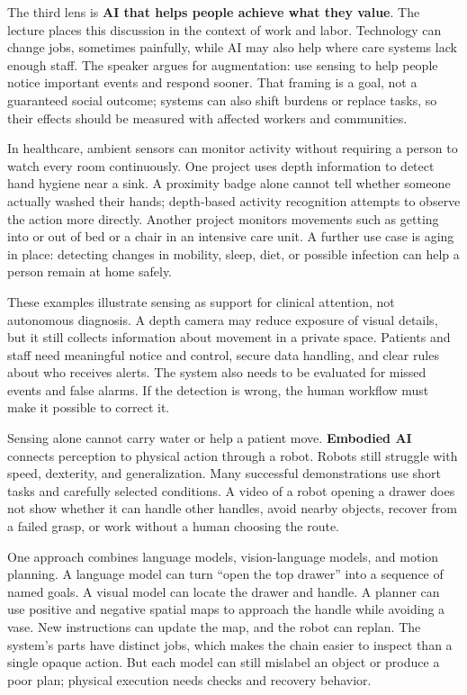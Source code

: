 The third lens is \textbf{AI that helps people achieve what they value}. The lecture places this discussion in the context of work and labor. Technology can change jobs, sometimes painfully, while AI may also help where care systems lack enough staff. The speaker argues for augmentation: use sensing to help people notice important events and respond sooner. That framing is a goal, not a guaranteed social outcome; systems can also shift burdens or replace tasks, so their effects should be measured with affected workers and communities.

In healthcare, ambient sensors can monitor activity without requiring a person to watch every room continuously. One project uses depth information to detect hand hygiene near a sink. A proximity badge alone cannot tell whether someone actually washed their hands; depth-based activity recognition attempts to observe the action more directly. Another project monitors movements such as getting into or out of bed or a chair in an intensive care unit. A further use case is aging in place: detecting changes in mobility, sleep, diet, or possible infection can help a person remain at home safely.

These examples illustrate sensing as support for clinical attention, not autonomous diagnosis. A depth camera may reduce exposure of visual details, but it still collects information about movement in a private space. Patients and staff need meaningful notice and control, secure data handling, and clear rules about who receives alerts. The system also needs to be evaluated for missed events and false alarms. If the detection is wrong, the human workflow must make it possible to correct it.

Sensing alone cannot carry water or help a patient move. \textbf{Embodied AI} connects perception to physical action through a robot. Robots still struggle with speed, dexterity, and generalization. Many successful demonstrations use short tasks and carefully selected conditions. A video of a robot opening a drawer does not show whether it can handle other handles, avoid nearby objects, recover from a failed grasp, or work without a human choosing the route.

One approach combines language models, vision-language models, and motion planning. A language model can turn ``open the top drawer'' into a sequence of named goals. A visual model can locate the drawer and handle. A planner can use positive and negative spatial maps to approach the handle while avoiding a vase. New instructions can update the map, and the robot can replan. The system's parts have distinct jobs, which makes the chain easier to inspect than a single opaque action. But each model can still mislabel an object or produce a poor plan; physical execution needs checks and recovery behavior.

